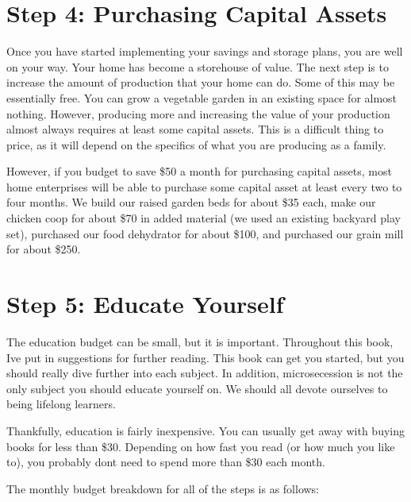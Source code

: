 \section{Step 4: Purchasing Capital Assets}

Once you have started implementing your savings and storage plans, you
are well on your way. Your home has become a storehouse of value. The
next step is to increase the amount of production that your home can
do. Some of this may be essentially free. You can grow a vegetable
garden in an existing space for almost nothing. However, producing more
and increasing the value of your production almost always requires at
least some capital assets. This is a difficult thing to price, as it
will depend on the specifics of what you are producing as a family.


However, if you budget to save \$50 a month for purchasing capital
assets, most home enterprises will be able to purchase some capital
asset at least every two to four months. We build our raised garden
beds for about \$35 each, make our chicken coop for about \$70 in added
material (we used an existing backyard play set), purchased our food
dehydrator for about \$100, and purchased our grain mill for about
\$250. 

\section{Step 5: Educate Yourself}

The education budget can be small, but it is important. Throughout this
book, I{\textquotesingle}ve put in suggestions for further reading.
This book can get you started, but you should really dive further into
each subject. In addition, microsecession is not the only subject you
should educate yourself on. We should all devote ourselves to being
lifelong learners.


Thankfully, education is fairly inexpensive. You can usually get away
with buying books for less than \$30. Depending on how fast you read
(or how much you like to), you probably don{\textquotesingle}t need to
spend more than \$30 each month. 


The monthly budget breakdown for all of the steps is as follows:


